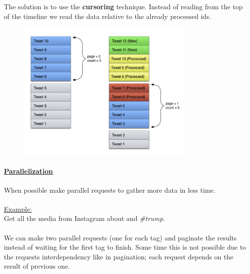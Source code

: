 \documentclass[10pt,a4paper]{article}
\newcommand{\nline}{\\~\\}
\begin{document}
 The solution is to use the \textbf{cursoring} technique. Instead of reading from the top of the timeline we read the data relative to the already processed ids.
   \begin{figure}[ht!]
 \hfill \includegraphics[width=250pt]{images/challenges-page3}
 \hspace*{\fill}
 \end{figure}
 \pagebreak
 \paragraph{\uline{Parallelization}} 
When possible make parallel requests to gather more data in less time. \nline
\uline{Example:} \\
Get all the media from Instagram about \textit{\@potus} and \textit{\#trump}.\nline
We can make two parallel requests (one for each tag) and paginate
the results instead of waiting for the first tag to finish.
Some time this is not possible due to the requests interdependency like in pagination; each request depends on the result of previous one.
\end{document}
